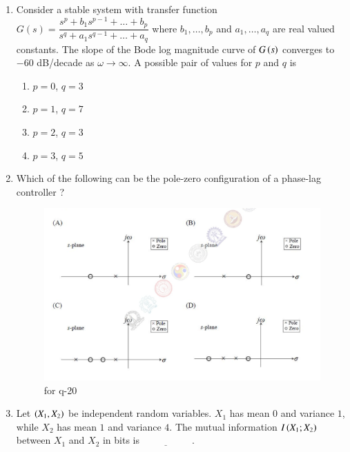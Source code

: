 \documentclass[journal,12pt,onecolumn]{IEEEtran}
\theoremstyle{remark}
\begin{document}
\begin{enumerate}
\hfill {}

\item Consider a stable system with transfer function  
$G(s) = \dfrac{s^p + b_1 s^{p-1} + \dots + b_p}{s^q + a_1 s^{q-1} + \dots + a_q}$  
where $b_1, \dots, b_p$ and $a_1, \dots, a_q$ are real valued constants. The slope of the Bode log magnitude curve of $G\left(s\right)$ converges to $-60$ dB/decade as $\omega \to \infty$. A possible pair of values for $p$ and $q$ is
\begin{multicols}{2}
\begin{enumerate}
\item $p = 0$, $q = 3$
\item $p = 1$, $q = 7$
\item $p = 2$, $q = 3$
\item $p = 3$, $q = 5$
\end{enumerate}
\end{multicols}
\hfill {}

\item Which of the following can be the pole-zero configuration of a phase-lag controller ?
\begin{figure}[H]
    \centering
    \includegraphics[width=0.9\columnwidth]{figs/7.png}
    \caption{\centering for q-20}
    \label{fig:placeholder_7}
\end{figure}

\hfill {}

\item Let $\left(X_1, X_2\right)$ be independent random variables. $X_1$ has mean $0$ and variance $1$, while $X_2$ has mean $1$ and variance $4$. The mutual information $I\left(X_1; X_2\right)$ between $X_1$ and $X_2$ in bits is $\underline{\hspace{2cm}}$ . 


\end{enumerate}
\end{document}

